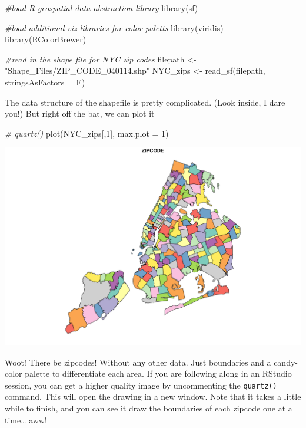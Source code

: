 \documentclass[
  openany]{book}
\newenvironment{Shaded}{\begin{snugshade}}{\end{snugshade}}
\newcommand{\AttributeTok}[1]{\textcolor[rgb]{0.77,0.63,0.00}{#1}}
\newcommand{\CommentTok}[1]{\textcolor[rgb]{0.56,0.35,0.01}{\textit{#1}}}
\newcommand{\DecValTok}[1]{\textcolor[rgb]{0.00,0.00,0.81}{#1}}
\newcommand{\FunctionTok}[1]{\textcolor[rgb]{0.00,0.00,0.00}{#1}}
\newcommand{\NormalTok}[1]{#1}
\newcommand{\OtherTok}[1]{\textcolor[rgb]{0.56,0.35,0.01}{#1}}
\newcommand{\StringTok}[1]{\textcolor[rgb]{0.31,0.60,0.02}{#1}}
\begin{document}
\begin{Shaded}
\begin{Highlighting}[]
\CommentTok{\#load R geospatial data abstraction library}
\FunctionTok{library}\NormalTok{(sf)}

\CommentTok{\#load additional viz libraries for color paletts}
\FunctionTok{library}\NormalTok{(viridis)}
\FunctionTok{library}\NormalTok{(RColorBrewer)}

\CommentTok{\#read in the shape file for NYC zip codes}
\NormalTok{filepath }\OtherTok{\textless{}{-}} \StringTok{"Shape\_Files/ZIP\_CODE\_040114.shp"}
\NormalTok{NYC\_zips }\OtherTok{\textless{}{-}} \FunctionTok{read\_sf}\NormalTok{(filepath, }\AttributeTok{stringsAsFactors =}\NormalTok{ F)}
\end{Highlighting}
\end{Shaded}

The data structure of the shapefile is pretty complicated. (Look inside, I dare you!)
But right off the bat, we can plot it

\begin{Shaded}
\begin{Highlighting}[]
\CommentTok{\# quartz()}
\FunctionTok{plot}\NormalTok{(NYC\_zips[,}\DecValTok{1}\NormalTok{], }\AttributeTok{max.plot =} \DecValTok{1}\NormalTok{)}
\end{Highlighting}
\end{Shaded}

\begin{center}\includegraphics[width=0.9\linewidth]{carpedatum_files/figure-html/unnamed-chunk-81-1} \end{center}

Woot! There be zipcodes! Without any other data. Just boundaries and a candy-color palette to differentiate each area. If you are following along in an RStudio session, you can get a higher quality image by uncommenting the \texttt{quartz()} command. This will open the drawing in a new window. Note that it takes a little while to finish, and you can see it draw the boundaries of each zipcode one at a time\ldots{} aww!
\end{document}
